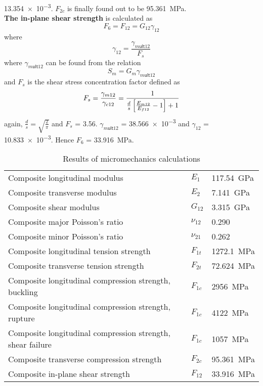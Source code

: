 \documentclass[a4paper,twosided,11pt,DIV14]{scrartcl}
\begin{document}
\num{13.354e-3}. $F_{2c}$ is finally found out to be \SI{95.361}{MPa}.
%
\\\textbf{The in-plane shear strength} is calculated as
%
\begin{equation}
  F_6 = F_{12} = G_{12}\gamma_{12}
\end{equation}
%
where
%
\begin{equation}
  \gamma_{12} = \frac{\gamma_{m\textsf{ult}12}}{F_s}
\end{equation}
%
where $\gamma_{m\textsf{ult}12}$ can be found from the relation
%
\begin{equation}
  S_m = G_m \gamma_{m\textsf{ult}12}
\end{equation}
%
and $F_s$ is the shear stress concentration factor defined as
%
\begin{equation}
  F_s = \frac{\gamma_{m12}}{\gamma_{c12}} = \frac{1}{\frac{d}{s}\left[\frac{E_{m12}}{E_{f12}}-1\right]+1}
\end{equation}
%
again, $\frac{d}{s}=\sqrt{\frac{2}{\pi}}$ and $F_s$ = \num{3.56}.
$\gamma_{m\textsf{ult}12}$ = \num{38.566e-3} and $\gamma_{12}$ =
\num{10.833e-3}. Hence $F_6$ = \SI{33.916}{MPa}.

\begin{table}[htbp]
  \centering
  \begin{tabular}{lll}
    \toprule
    Composite longitudinal modulus & $E_1$ & \SI{117.54}{GPa}\\
    Composite transverse modulus & $E_2$ & \SI{7.141}{GPa}\\
    Composite shear modulus & $G_{12}$ & \SI{3.315}{GPa}\\
    Composite major Poisson's ratio &$\nu_{12}$ & \num{0.290}\\
    Composite minor Poisson's ratio &$\nu_{21}$ & \num{0.262}\\
    Composite longitudinal tension strength & $F_{1t}$ & \SI{1272.1}{MPa}\\
    Composite transverse tension strength & $F_{2t}$ & \SI{72.624}{MPa}\\
    Composite longitudinal compression strength, buckling & $F_{1c}$ & \SI{2956}{MPa}\\
    Composite longitudinal compression strength, rupture  & $F_{1c}$ & \SI{4122}{MPa}\\
    Composite longitudinal compression strength, shear failure & $F_{1c}$ & \SI{1057}{MPa}\\
    Composite transverse compression strength & $F_{2c}$ & \SI{95.361}{MPa}\\
    Composite in-plane shear strength & $F_{12}$ & \SI{33.916}{MPa}\\
    \bottomrule
  \end{tabular}
  \caption{Results of micromechanics calculations}
\end{table}
\end{document}
